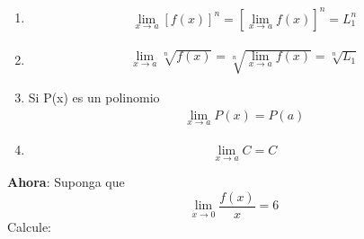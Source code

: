 \documentclass{article}
\begin{document}
\begin{enumerate}
\begin{enumerate}
\begin{center}
            Ambos existen. Finalmente L1 $\cdot$ L2 = 3 $\cdot$ 4 = 12
        \end{center}
    \end{enumerate}
    \textbf{Veamos}
    \begin{equation}
        \begin{aligned}
            \lim_{x\rightarrow 1+} \frac{f(x)}{f(x)- g(x)} =
            \frac{\lim_{x\rightarrow 1+}f(X)}{\lim_{x\rightarrow 1+}f(x)- g(x)} = 
            \frac{2}{2-(-2)} = \frac{1}{2}
        \end{aligned}
    \end{equation} (continua...)
    \item 
    \begin{equation}
        \begin{aligned}
            \lim_{x\rightarrow a}[f(x)]^n = [\lim_{x\rightarrow a}f(x)]^n = L_{1}^n
        \end{aligned}
    \end{equation}
    \item
    \begin{equation}
        \begin{aligned}
            \lim_{x\rightarrow a} \sqrt[n]{f(x)} = \sqrt[n]{\lim_{x\rightarrow a}f(x)}
            = \sqrt[n]{L_{1}}
        \end{aligned}
    \end{equation}
    \item Si P(x) es un polinomio \begin{equation}
        \begin{aligned}
            \lim_{x\rightarrow a}P(x) = P(a)
        \end{aligned}
    \end{equation}
    \item \begin{equation}
        \lim_{x\rightarrow a} C = C
    \end{equation}
\end{enumerate}
\textbf{Ahora}: \newline
Suponga que \begin{equation}
    \lim_{x\rightarrow 0}\frac{f(x)}{x} = 6
\end{equation} Calcule:
\end{document}
